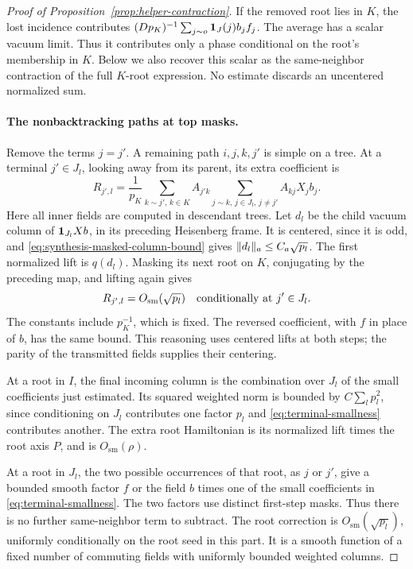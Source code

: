 \begin{proof}[Proof of Proposition~\ref{prop:helper-contraction}]
If the removed root lies in \(K\), the lost incidence contributes
\((Dp_K)^{-1}\sum_{j\sim o}\mathbf 1_J(j)b_jf_j\).
The average has a scalar vacuum limit.  Thus it contributes only a
phase conditional on the root's membership in \(K\).  Below we also
recover this scalar as the same-neighbor contraction of the full
\(K\)-root expression.  No estimate discards an uncentered
normalized sum.

\paragraph{The nonbacktracking paths at top masks.}
Remove the terms \(j=j'\).  A remaining path
\(i,j,k,j'\) is simple on a tree.  At a terminal \(j'\in J_l\),
looking away from its parent, its extra coefficient is
\begin{equation}
 R_{j',l}=\frac1{p_K}
   \sum_{k\sim j',\,k\in K} A_{j'k}
   \sum_{j\sim k,\,j\in J_l,\,j\ne j'}
         A_{kj}X_jb_j.
 \label{eq:extra-terminal-coefficient}
\end{equation}
Here all inner fields are computed in descendant trees.  Let
\(d_l\) be the child vacuum column of \(\mathbf 1_{J_l}Xb\), in its
preceding Heisenberg frame.  It is centered, since it is odd, and
\eqref{eq:synthesis-masked-column-bound} gives
\(\lVert d_l\rVert_a\le C_a\sqrt{p_l}\).
The first normalized lift is \(q(d_l)\).  Masking its next root on
\(K\), conjugating by the preceding map, and lifting again gives
\begin{equation}
 R_{j',l}=O_{\mathrm{sm}}(\sqrt{p_l})
 \quad\hbox{conditionally at }j'\in J_l.
 \label{eq:terminal-smallness}
\end{equation}
The constants include \(p_K^{-1}\), which is fixed.  The reversed
coefficient, with \(f\) in place of \(b\), has the same bound.
This reasoning uses centered lifts at both steps; the parity of the
transmitted fields supplies their centering.

At a root in \(I\), the final incoming column is the combination
over \(J_l\) of the small coefficients just estimated.  Its squared
weighted norm is bounded by
\(C\sum_l p_l^2\), since conditioning on \(J_l\) contributes
one factor \(p_l\) and \eqref{eq:terminal-smallness} contributes
another.  The extra root Hamiltonian is its normalized lift times
the root axis \(P\), and is \(O_{\mathrm{sm}}(\rho)\).

At a root in \(J_l\), the two possible occurrences of that root,
as \(j\) or \(j'\), give a bounded smooth factor \(f\) or the
field \(b\) times one of the small coefficients in
\eqref{eq:terminal-smallness}.  The two factors use distinct
first-step masks.  Thus there is no further same-neighbor term to
subtract.  The root correction is
\(O_{\mathrm{sm}}(\sqrt{p_l})\), uniformly conditionally on the
root seed in this part.  It is a smooth function of a fixed number of
commuting fields with uniformly bounded weighted columns.


\end{proof}
